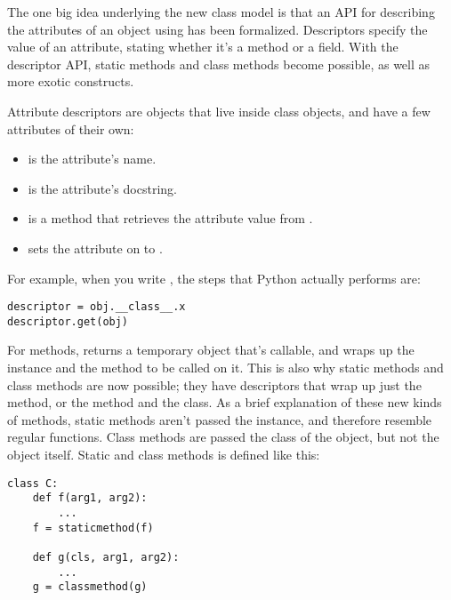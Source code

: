 \documentclass{howto}
\begin{document}
The one big idea underlying the new class model is that an API for
describing the attributes of an object using  has
been formalized.  Descriptors specify the value of an attribute,
stating whether it's a method or a field.  With the descriptor API,
static methods and class methods become possible, as well as more
exotic constructs.

Attribute descriptors are objects that live inside class objects, and
have a few attributes of their own:

\begin{itemize}

\item {} is the attribute's name.

\item {} is the attribute's docstring.

\item {} is a method that retrieves the attribute value from .

\item {} sets the attribute
on  to .

\end{itemize}

For example, when you write , the steps that Python
actually performs are:

\begin{verbatim}
descriptor = obj.__class__.x
descriptor.get(obj)
\end{verbatim}

For methods,  returns a temporary object that's
callable, and wraps up the instance and the method to be called on it.
This is also why static methods and class methods are now possible;
they have descriptors that wrap up just the method, or the method and
the class.  As a brief explanation of these new kinds of methods,
static methods aren't passed the instance, and therefore resemble
regular functions.  Class methods are passed the class of the object,
but not the object itself.  Static and class methods is defined like
this:

\begin{verbatim}
class C:
    def f(arg1, arg2):
        ...
    f = staticmethod(f)

    def g(cls, arg1, arg2):
        ...
    g = classmethod(g)
\end{verbatim}
\end{document}
